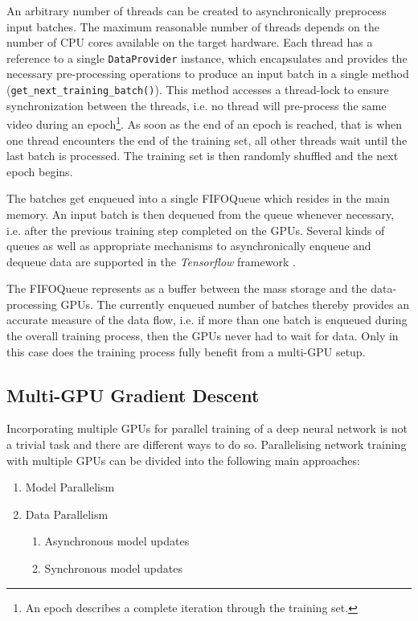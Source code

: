An arbitrary number of threads can be created to asynchronically preprocess input batches.
The maximum reasonable number of threads depends on the number of CPU cores available on the target hardware.
Each thread has a reference to a single \texttt{DataProvider} instance, which encapsulates and provides the necessary pre-processing operations to produce an input batch in a single method (\texttt{get\_next\_training\_batch()}).
This method accesses a thread-lock to ensure synchronization between the threads, i.e. no thread will pre-process the same video during an epoch\footnote{An epoch describes a complete iteration through the training set.}.
As soon as the end of an epoch is reached, that is when one thread encounters the end of the training set, all other threads wait until the last batch is processed.
The training set is then randomly shuffled and the next epoch begins.

The batches get enqueued into a single FIFOQueue which resides in the main memory.
An input batch is then dequeued from the queue whenever necessary, i.e. after the previous training step completed on the GPUs.
Several kinds of queues as well as appropriate mechanisms to asynchronically enqueue and dequeue data are supported in the \textit{Tensorflow} framework \cite{abadi_tensorflow:_2016}.

The FIFOQueue represents as a buffer between the mass storage and the data-processing GPUs.
The currently enqueued number of batches thereby provides an accurate measure of the data flow, i.e. if more than one batch is enqueued during the overall training process, then the GPUs never had to wait for data.
Only in this case does the training process fully benefit from a multi-GPU setup.


\subsection{Multi-GPU Gradient Descent}
\label{sec:multi_gpu}
Incorporating multiple GPUs for parallel training of a deep neural network is not a trivial task and there are different ways to do so.
Parallelising network training with multiple GPUs can be divided into the following main approaches:
\begin{enumerate}
    \item Model Parallelism
    \item Data Parallelism
    \begin{enumerate}
        \item Asynchronous model updates
        \item Synchronous model updates
    \end{enumerate}
\end{enumerate}


